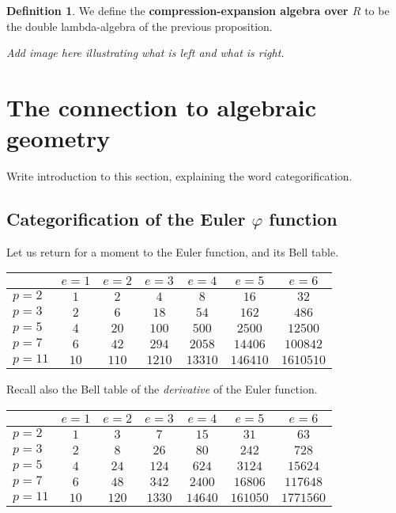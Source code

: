 \documentclass[a4paper]{article}
\theoremstyle{definition}
\newtheorem{definition}{Definition}[section]
\theoremstyle{remark}
\newcommand{\defhl}[1]{\textbf{#1}}
\begin{document}
\begin{definition}
We define the \defhl{compression-expansion algebra over $R$} to be the double lambda-algebra of the previous proposition.
\end{definition}
 



\emph{Add image here illustrating what is left and what is right.}





\section{The connection to algebraic geometry}

Write introduction to this section, explaining the word categorification.

\subsection{Categorification of the Euler $\varphi$ function}

Let us return for a moment to the Euler function, and its Bell table.

\begin{center}
\begin{tabular}{| l | | c | c | c | c | c | c |}
\hline
& $e = 1$ & $e = 2$ & $e = 3$ & $e = 4$ & $e = 5$ & $e = 6$\\
\hline
\hline
$p = 2$ & $1$ & $2$ & $4$ & $8$ & $16$ & $32$ \\
\hline
$p = 3$ & $2$ & $6$ & $18$ & $54$ & $162$ & $486$ \\
\hline
$p = 5$ & $4$ & $20$ & $100$ & $500$ & $2500$ & $12500$ \\
\hline
$p = 7$ & $6$ & $42$ & $294$ & $2058$ & $14406$ & $100842$ \\
\hline
$p = 11$ & $10$ & $110$ & $1210$ & $13310$ & $146410$ & $1610510$ \\
\hline
\end{tabular}
\end{center}

Recall also the Bell table of the \emph{derivative} of the Euler function.

\vskip10pt
\begin{center}
\begin{tabular}{| l | | c | c | c | c | c | c |}
\hline
& $e = 1$ & $e = 2$ & $e = 3$ & $e = 4$ & $e = 5$ & $e = 6$\\
\hline
\hline
$p = 2$ & $1$ & $3$ & $7$ & $15$ & $31$ & $63$ \\
\hline
$p = 3$ & $2$ & $8$ & $26$ & $80$ & $242$ & $728$ \\
\hline
$p = 5$ & $4$ & $24$ & $124$ & $624$ & $3124$ & $15624$ \\
\hline
$p = 7$ & $6$ & $48$ & $342$ & $2400$ & $16806$ & $117648$ \\
\hline
$p = 11$ & $10$ & $120$ & $1330$ & $14640$ & $161050$ & $1771560$ \\
\hline
\end{tabular}
\end{center}
\end{document}
